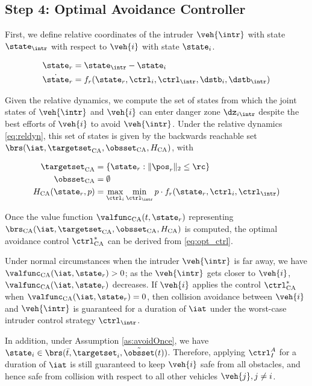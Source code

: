 \subsection{Step 4: Optimal Avoidance Controller \label{sec:intruder_avoid}}
First, we define relative coordinates of the intruder $\veh{\intr}$ with state $\state_\intr$ with respect to $\veh{i}$ with state $\state_i$.

\begin{equation}
\label{eq:reldyn}
\begin{aligned}
\state_r &= \state_\intr - \state_i \\
\dot \state_r &= f_r(\state_r, \ctrl_i, \ctrl_\intr, \dstb_i, \dstb_\intr)
\end{aligned}
\end{equation}

Given the relative dynamics, we compute the set of states from which the joint states of $\veh{\intr}$ and $\veh{i}$ can enter danger zone $\dz_{i\intr}$ despite the best efforts of $\veh{i}$ to avoid $\veh{\intr}$. Under the relative dynamics \eqref{eq:reldyn}, this set of states is given by the backwards reachable set $\brs(\iat, \targetset_\text{CA}, \obsset_\text{CA}, H_\text{CA})$, with

\begin{equation}
\begin{aligned}
\targetset_\text{CA} &= \{\state_r: \|\pos_r\|_2 \le \rc\} \\
\obsset_\text{CA} &= \emptyset \\
H_\text{CA}(\state_r, p) &= \max_{\ctrl_i} \min_{\ctrl_\intr} p \cdot f_r(\state_r, \ctrl_i, \ctrl_\intr)
\end{aligned}
\end{equation}

Once the value function $\valfunc_\text{CA}(t, \state_r)$ representing $\brs_\text{CA}(\iat, \targetset_\text{CA}, \obsset_\text{CA}, H_\text{CA})$ is computed, the optimal avoidance control $\ctrl^*_\text{CA}$ can be derived from \eqref{eq:opt_ctrl}.

Under normal circumstances when the intruder $\veh{\intr}$ is far away, we have $\valfunc_\text{CA}(\iat, \state_r) > 0$; as the $\veh{\intr}$ gets closer to $\veh{i}$, $\valfunc_\text{CA}(\iat, \state_r)$ decreases. If $\veh{i}$ applies the control $\ctrl^*_\text{CA}$ when $\valfunc_\text{CA}(\iat, \state_r) = 0$, then collision avoidance between $\veh{i}$ and $\veh{\intr}$ is guaranteed for a duration of $\iat$ under the worst-case intruder control strategy $\ctrl_\intr$.

In addition, under Assumption \ref{as:avoidOnce}, we have $\state_i \in \brs(\bar t, \targetset_i, \tilde\obsset(t))$. Therefore, applying $\ctrl_I^A$ for a duration of $\iat$ is still guaranteed to keep $\veh{i}$ safe from all obstacles, and hence safe from collision with respect to all other vehicles $\veh{j}, j \neq i$.